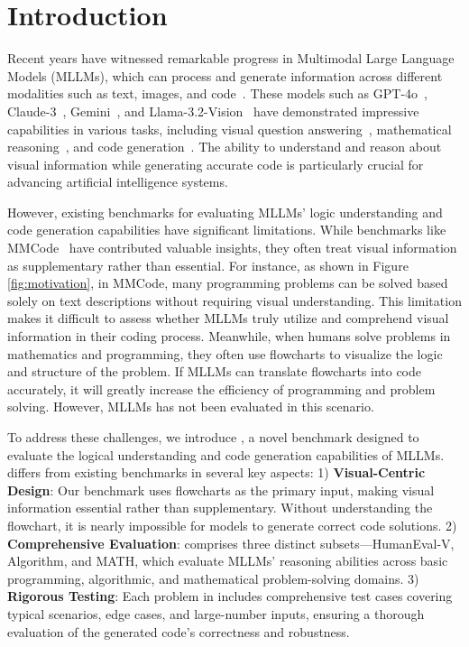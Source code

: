 \section{Introduction}

Recent years have witnessed remarkable progress in Multimodal Large Language Models (MLLMs), which can process and generate information across different modalities such as text, images, and code~\cite{gpt4o,Claude3,Claude3.5_Sonnet,Llama3.2,geminiteam2024gemini15unlockingmultimodal,yao2024minicpm}. These models such as GPT-4o~\cite{gpt4o}, Claude-3~\cite{Claude3}, Gemini~\cite{geminiteam2024gemini15unlockingmultimodal}, and Llama-3.2-Vision~\cite{Llama3.2} have demonstrated impressive capabilities in various tasks, including visual question answering~\cite{singh2019towards,goyal2017making,marino2019ok,li2021adversarial}, mathematical reasoning~\cite{lu2024mathvista,wang2024measuring}, and code generation~\cite{li2024mmcode,shi2024chartmimic}. The ability to understand and reason about visual information while generating accurate code is particularly crucial for advancing artificial intelligence systems.  

However, existing benchmarks for evaluating MLLMs' logic understanding and code generation capabilities have significant limitations. While benchmarks like MMCode~\cite{li2024mmcode} have contributed valuable insights, they often treat visual information as supplementary rather than essential. For instance, as shown in Figure \ref{fig:motivation}, in MMCode, many programming problems can be solved based solely on text descriptions without requiring visual understanding. This limitation makes it difficult to assess whether MLLMs truly utilize and comprehend visual information in their coding process. Meanwhile, when humans solve problems in mathematics and programming, they often use flowcharts to visualize the logic and structure of the problem. If MLLMs can translate flowcharts into code accurately, it will greatly increase the efficiency of programming and problem solving. However, MLLMs has not been evaluated in this scenario.

To address these challenges, we introduce \benchmark, a novel benchmark designed to evaluate the logical understanding and code generation capabilities of MLLMs. \benchmark differs from existing benchmarks in several key aspects: 1) \textbf{Visual-Centric Design}: Our benchmark uses flowcharts as the primary input, making visual information essential rather than supplementary. Without understanding the flowchart, it is nearly impossible for models to generate correct code solutions. 2) \textbf{Comprehensive Evaluation}: \benchmark comprises three distinct subsets—HumanEval-V, Algorithm, and MATH, which evaluate MLLMs' reasoning abilities across basic programming, algorithmic, and mathematical problem-solving domains. 3) \textbf{Rigorous Testing}: Each problem in \benchmark includes comprehensive test cases covering typical scenarios, edge cases, and large-number inputs, ensuring a thorough evaluation of the generated code's correctness and robustness.

